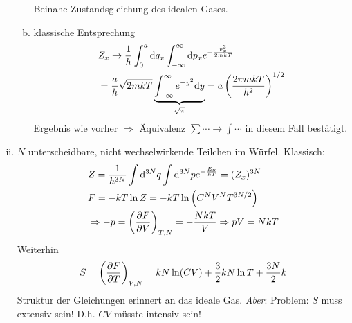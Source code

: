 \begin{enumerate}[i)]
\begin{enumerate}[a)]
\begin{equation}
        \end{equation}
        Beinahe Zustandsgleichung des idealen Gases.
        \item klassische Entsprechung
        \begin{equation}
            \begin{split}
                & Z_x \rightarrow \frac{1}{h} \int_{0}^{a} \mathrm{d} q_x \int_{-\infty}^{\infty} \mathrm{d} p_x e^{-\frac{p_x^2}{2m kT}} \\
                & = \frac{a}{h} \sqrt{2 m k T} \underbrace{\int_{-\infty}^{\infty} e^{-y^2} \mathrm{d} y}_{\sqrt{\pi}} = a \left( \frac{2 \pi m k T}{h^2} \right)^{1/2}
            \end{split}
        \end{equation}
        Ergebnis wie vorher $\Rightarrow$ Äquivalenz $\sum \cdots \rightarrow \int \cdots$ in diesem Fall bestätigt.
    \end{enumerate}
    \item $N$ unterscheidbare, nicht wechselwirkende Teilchen im Würfel. Klassisch:
    \begin{equation}
        \begin{split}
            & Z = \frac{1}{h^{3N}} \int \mathrm{d}^{3N} q \int \mathrm{d}^{3N}p e^{- \frac{E_\nu}{kT}} = (Z_x)^{3N} \\
            & F = - k T \ln Z = - k T \ln \left( C^N V^N T^{3N/2} \right) \\
            & \Rightarrow - p = \left( \frac{\partial F}{\partial V} \right)_{T, N} = - \frac{N k T}{V} \Rightarrow p V = N k T
        \end{split}
    \end{equation}
    Weiterhin
    \begin{equation}
        S = \left( \frac{\partial F}{\partial T} \right)_{V, N} = k N \ln (CV) + \frac{3}{2} k N \ln T + \frac{3N}{2} k
    \end{equation}
    Struktur der Gleichungen erinnert an das ideale Gas. \emph{Aber}: Problem: $S$ muss extensiv sein! D.h. $CV$ müsste intensiv sein!
\end{enumerate}